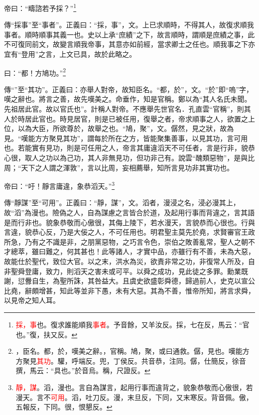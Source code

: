 帝曰：“疇諮若予採？”\footnote{\textcolor{red}{採，事}也。復求誰能順我\textcolor{red}{事者}。予音餘，又羊汝反。採，七在反，馬云：“官也。”復，扶又反。}

{\noindent\zhuan{}\fzbyks 傳“採事”至“事者”。正義曰：“採，事”，文。上已求順時，不得其人，故復求順我事者。順時順事其義一也。史以上承“庶績”之下，故言順時，謂順是庶績之事，此不可復同前文，故變言順我帝事，其意亦如前經，當求卿士之任也。順我事之下亦宜有“登用”之言，上文已具，故於此略之。 \par}

曰：“都！方鳩功。”\footnote{\textcolor{red}{}，臣名。都，於，嘆美之辭。，官稱。鳩，聚，或曰通救。僝，見也。嘆能方方聚見\textcolor{red}{其功}。驩，呼端反。兜，丁侯反。共音恭，注同。僝，仕簡反，徐音撰，馬云：“具也。”於音烏。稱，尺證反。}

{\noindent\zhuan{}\fzbyks 傳“”至“其功”。正義曰：亦舉人對帝，故知臣名。“都，於”，文。“於”即“嗚”字，嘆之辭也。將言之善，故先嘆美之。命垂作，知是官稱。鄭以為“其人名氏未聞。先祖居此官。故以官氏也”。計稱人對帝。不應舉先世官名．孔直雲“官稱”，則其人於時居此官也。時見居官，則是已被任用，復舉之者，帝求順事之人，欲置之上位，以為大臣，所欲尊於，故舉之也。“鳩，聚”，文。僝然，見之狀，故為見。“嘆能方方聚見其功”，謂每於所在之方，皆能聚集善事，以見其功，言可用也。若能實有見功，則是可任用之人，帝言其庸違滔天不可任者，言是行非，貌恭心很，取人之功以為己功，其人非無見功，但功非己有。說雲“醜類惡物”，是與比周；“天下之人謂之渾敦”，言以比周，妄相薦舉，知所言見功非其實功也。 \par}

帝曰：“吁！靜言庸違，象恭滔天。”\footnote{\textcolor{red}{靜，謀}。滔，漫也。言自為謀言，起用行事而違背之，貌象恭敬而心傲很，若漫天。言不\textcolor{red}{可用}。滔，吐刀反。漫，末旦反，下同，又末寒反。背音佩。傲，五報反，下同。很，恨懇反。}

{\noindent\zhuan{}\fzbyks 傳“靜謀”至“可用”。正義曰：“靜，謀”，文。滔者，漫浸之名，浸必漫其上，故“滔”為漫也。險偽之人，自為謀慮之言皆合於道，及起用行事而背違之，言其語是而行非也。貌象恭敬而心傲很，其侮上陵下，若水漫天，言貌恭而心很也。行與言違，貌恭心反，乃是大佞之人，不可任用也。明君聖主莫先於堯，求賢審官王政所急，乃有之不識是非，之朋黨惡物，之巧言令色，崇伯之敗善亂常，聖人之朝不才總萃，雖曰難之，何其甚也！此等諸人，才實中品，亦雖行有不善，未為大惡，故能仕於聖代，致位大官。以之末，洪水為災，欲責非常之功，非復常人所及，自非聖舜登庸，致力，則滔天之害未或可平。以舜之成功，見此徒之多罪。勳業既謝，愆釁自生，為聖所誅，其咎益大。且虞史欲盛彰舜德，歸過前人，史克以宣公比堯，辭頗增甚，知此等並非下愚，未有大惡。其為不善，惟帝所知，將言求舜，以見帝之知人耳。 \par}

